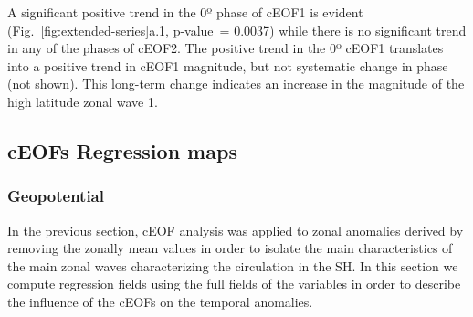 \documentclass[pdflatex,sn-basic]{sn-jnl}
\theoremstyle{thmstyleone}%
\theoremstyle{thmstyletwo}%
\theoremstyle{thmstylethree}%
\begin{document}
A significant positive trend in the 0º phase of cEOF1 is evident (Fig.~\ref{fig:extended-series}a.1, p-value~= 0.0037) while there is no significant trend in any of the phases of cEOF2.
The positive trend in the 0º cEOF1 translates into a positive trend in cEOF1 magnitude, but not systematic change in phase (not shown).
This long-term change indicates an increase in the magnitude of the high latitude zonal wave 1.

\hypertarget{regressions}{%
\subsection{cEOFs Regression maps}\label{regressions}}

\hypertarget{geopotential}{%
\subsubsection{Geopotential}\label{geopotential}}

In the previous section, cEOF analysis was applied to zonal anomalies derived by removing the zonally mean values in order to isolate the main characteristics of the main zonal waves characterizing the circulation in the SH.
In this section we compute regression fields using the full fields of the variables in order to describe the influence of the cEOFs on the temporal anomalies.
\end{document}
